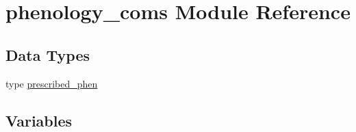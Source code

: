 \hypertarget{namespacephenology__coms}{}\section{phenology\+\_\+coms Module Reference}
\label{namespacephenology__coms}
\subsection*{Data Types}
\begin{DoxyCompactItemize}
\item 
type \hyperlink{structphenology__coms_1_1prescribed__phen}{prescribed\+\_\+phen}
\end{DoxyCompactItemize}
\subsection*{Variables}
